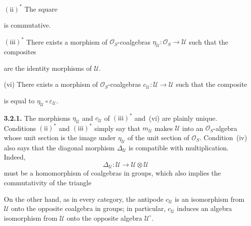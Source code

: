 \noindent
\((\mathrm{ii})^{*}\) The square
\begin{center}
  \label{sga3:VIIA:3.2-associativity-ii-star}
  
\end{center}
is commutative.

\noindent
\((\mathrm{iii})^{*}\) There exists a morphism of
\(\mathcal O_S\)-coalgebras
\(\eta_{\mathcal U}:\mathcal O_S\to\mathcal U\) such that the composites
\begin{center}
  \label{sga3:VIIA:3.2-unit-sequences-iii-star}
  
\end{center}
are the identity morphisms of \(\mathcal U\).

\smallskip
\noindent
(vi) There exists a morphism of \(\mathcal O_S\)-coalgebras
\(c_{\mathcal U}:\mathcal U\to\mathcal U\) such that the composite
\begin{center}
  \label{sga3:VIIA:3.2-antipode-sequence-vi}
  
\end{center}
is equal to \(\eta_{\mathcal U}\circ\varepsilon_{\mathcal U}\).

\medskip
\noindent\textbf{3.2.1.}
\label{sga3:VIIA:3.2.1}
The morphisms \(\eta_{\mathcal U}\) and \(c_{\mathcal U}\) of
\((\mathrm{iii})^{*}\) and~(vi) are plainly unique. Conditions
\((\mathrm{ii})^{*}\) and \((\mathrm{iii})^{*}\) simply say that
\(m_{\mathcal U}\) makes \(\mathcal U\) into an
\(\mathcal O_S\)-algebra whose unit section is the image under
\(\eta_{\mathcal U}\) of the unit section of \(\mathcal O_S\).
Condition~(iv) also says that the diagonal morphism
\(\Delta_{\mathcal U}\) is compatible with multiplication. Indeed,
\[
  \Delta_{\mathcal U}:\mathcal U\longrightarrow
  \mathcal U\otimes\mathcal U
\]
must be a homomorphism of coalgebras in groups, which also implies
the commutativity of the triangle
\begin{center}
  \label{sga3:VIIA:3.2.1-unit-triangle-v-star}
  
\end{center}

On the other hand, as in every category, the antipode
\(c_{\mathcal U}\) is an isomorphism from \(\mathcal U\) onto the
opposite coalgebra in groups;
in particular, \(c_{\mathcal U}\) induces an algebra isomorphism
from \(\mathcal U\) onto the opposite algebra
\(\mathcal U^{\circ}\).

